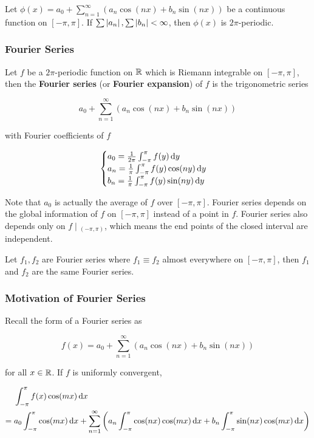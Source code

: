 \documentclass[a4paper,12pt]{article}
\begin{document}
\begin{pst}
  Let $\phi(x)=a_{0}+\sum_{n=1}^{\infty}(a_{n}\cos(nx)+b_{n}\sin(nx))$ be a continuous function on $[-\pi,\pi]$. If $\sum\left| a_{n}\right|,\sum\left| b_{n}\right|<\infty$, then $\phi(x)$ is $2\pi$-periodic.
\end{pst}

\subsubsection{Fourier Series}
\begin{dft}
  Let $f$ be a $2\pi$-periodic function on $\mathbb{R}$ which is Riemann integrable on $[-\pi,\pi]$, then the \textbf{Fourier series} (or \textbf{Fourier expansion}) of $f$ is the trigonometric series

  $$a_{0}+\sum_{n=1}^{\infty}(a_{n}\cos(nx)+b_{n}\sin(nx))$$\s

  with Fourier coefficients of $f$

  $$\begin{cases}
    a_{0}=\frac{1}{2\pi}\int_{-\pi}^{\pi}f(y)\,\mathrm{d} y\\
    a_{n}=\frac{1}{\pi}\int_{-\pi}^{\pi}f(y)\cos(ny)\,\mathrm{d} y\\
    b_{n}=\frac{1}{\pi}\int_{-\pi}^{\pi}f(y)\sin(ny)\,\mathrm{d} y
  \end{cases}$$
\end{dft}\n

Note that $a_{0}$ is actually the average of $f$ over $[-\pi,\pi]$. Fourier series depends on the global information of $f$ on $[-\pi,\pi]$ instead of a point in $f$. Fourier series also depends only on $f\!\mid\!_{(-\pi,\pi)}$, which means the end points of the closed interval are independent.\n

\begin{pst}
  Let $f_{1},f_{2}$ are Fourier series where $f_{1}\equiv f_{2}$ almost everywhere on $[-\pi,\pi]$, then $f_{1}$ and $f_{2}$ are the same Fourier series.
\end{pst}

\subsubsection{Motivation of Fourier Series}
Recall the form of a Fourier series as

$$f(x)=a_{0}+\sum_{n=1}^{\infty}(a_{n}\cos(nx)+b_{n}\sin(nx))$$\s

for all $x\in\mathbb{R}$. If $f$ is uniformly convergent,

$$\begin{aligned}[t]
  &\int_{-\pi}^{\pi}f(x)\cos(mx)\,\mathrm{d} x\\
  =\;&a_{0}\int_{-\pi}^{\pi}\cos(mx)\,\mathrm{d} x+\sum_{n=1}^{\infty}\left( a_{n}\int_{-\pi}^{\pi}\cos(nx)\cos(mx)\,\mathrm{d} x+b_{n}\int_{-\pi}^{\pi}\sin(nx)\cos(mx)\,\mathrm{d} x\right)
\end{aligned}$$\s
\end{document}
